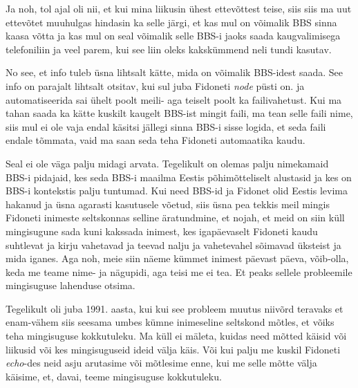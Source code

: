 Ja noh, tol ajal oli nii, et kui mina liikusin ühest ettevõttest teise, siis 
siis ma uut ettevõtet muuhulgas hindasin ka selle järgi, et kas mul on võimalik 
BBS sinna kaasa võtta ja kas mul on seal võimalik selle BBS-i jaoks saada  
kaugvalimisega telefoniliin ja veel parem, kui see liin oleks  kakskümmend neli 
tundi kasutav.


No see, et info tuleb üsna lihtsalt kätte, mida on võimalik BBS-idest saada. 
See info on parajalt lihtsalt otsitav, kui sul juba Fidoneti \emph{node} püsti 
on. ja automatiseerida sai ühelt poolt meili-  aga teiselt poolt ka 
failivahetust. Kui ma tahan saada ka kätte kuskilt kaugelt BBS-ist mingit 
faili, ma tean selle faili nime, siis mul ei ole vaja endal käsitsi jällegi 
sinna BBS-i sisse logida, et seda faili endale tõmmata, vaid ma saan seda teha 
Fidoneti automaatika kaudu.


Seal ei ole väga palju midagi arvata. Tegelikult on olemas palju nimekamaid 
BBS-i pidajaid, kes seda  BBS-i maailma Eestis põhimõtteliselt  alustasid ja 
kes on BBS-i kontekstis palju tuntumad. Kui need BBS-id ja Fidonet  olid Eestis 
levima hakanud ja üsna agarasti kasutusele võetud, siis üsna pea tekkis meil 
mingis Fidoneti inimeste seltskonnas  selline äratundmine, et nojah, et meid on 
siin küll mingisugune sada kuni kakssada inimest, kes igapäevaselt   Fidoneti 
kaudu suhtlevat ja kirju vahetavad ja teevad nalju ja vahetevahel sõimavad 
üksteist ja mida iganes. Aga noh, meie siin  näeme kümmet inimest päevast 
päeva, võib-olla, keda me teame nime- ja nägupidi, aga teisi me ei tea. Et 
peaks sellele probleemile mingisuguse lahenduse otsima. 

Tegelikult oli juba 1991. aasta, kui kui see probleem muutus niivõrd teravaks 
et enam-vähem siis seesama  umbes kümne inimeseline seltskond mõtles, et võiks 
teha mingisuguse kokkutuleku. Ma küll ei mäleta, kuidas need mõtted käisid või 
liikusid või kes mingisuguseid ideid välja käis. Või kui palju me kuskil 
Fidoneti \emph{echo}-des neid asju arutasime või mõtlesime enne, kui me selle 
mõtte välja käisime, et, davai, teeme mingisuguse kokkutuleku.

